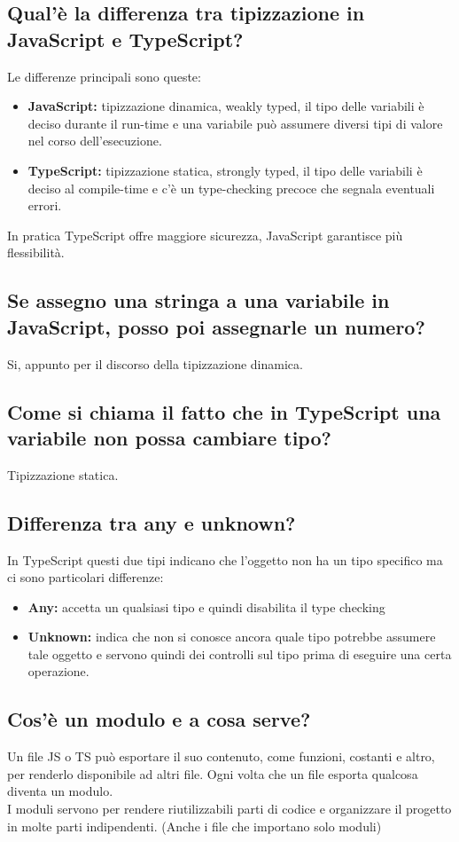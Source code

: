 \documentclass[12pt]{article}
\begin{document}
\subsection{Qual'è la differenza tra tipizzazione in JavaScript e TypeScript?}
Le differenze principali sono queste:
\begin{itemize}
  \item \textbf{JavaScript:} tipizzazione dinamica, weakly typed, il tipo delle variabili è deciso durante il run-time e una variabile può assumere diversi tipi di valore nel corso dell'esecuzione.
  \item \textbf{TypeScript:} tipizzazione statica, strongly typed, il tipo delle variabili è deciso al compile-time e c'è un type-checking precoce che segnala eventuali errori.
\end{itemize}
In pratica TypeScript offre maggiore sicurezza, JavaScript garantisce più flessibilità.

\subsection{Se assegno una stringa a una variabile in JavaScript, posso poi assegnarle un numero?}
Si, appunto per il discorso della tipizzazione dinamica.

\subsection{Come si chiama il fatto che in TypeScript una variabile non possa cambiare tipo?}
Tipizzazione statica. 

\subsection{Differenza tra any e unknown?}
In TypeScript questi due tipi indicano che l'oggetto non ha un tipo specifico ma ci sono particolari differenze:
\begin{itemize}
  \item \textbf{Any:} accetta un qualsiasi tipo e quindi disabilita il type checking
  \item \textbf{Unknown:} indica che non si conosce ancora quale tipo potrebbe assumere tale oggetto e servono quindi dei controlli sul tipo prima di eseguire una certa operazione.
\end{itemize}

\subsection{Cos’è un modulo e a cosa serve?}
Un file JS o TS può esportare il suo contenuto, come funzioni, costanti e altro, per renderlo disponibile ad altri file. Ogni volta che un file esporta qualcosa diventa un modulo.\\
I moduli servono per rendere riutilizzabili parti di codice e organizzare il progetto in molte parti indipendenti. (Anche i file che importano solo moduli)
\end{document}
